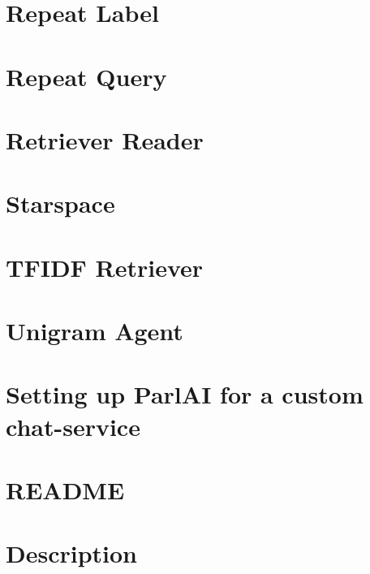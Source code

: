 \documentclass[twoside]{book}
\newcommand{\+}{\discretionary{\mbox{\scriptsize$\hookleftarrow$}}{}{}}
\begin{document}
\chapter{Repeat Label}
\label{md_parlai_agents_repeat_label_README}

\chapter{Repeat Query}
\label{md_parlai_agents_repeat_query_README}

\chapter{Retriever Reader}
\label{md_parlai_agents_retriever_reader_README}

\chapter{Starspace}
\label{md_parlai_agents_starspace_README}

\chapter{T\+F\+I\+DF Retriever}
\label{md_parlai_agents_tfidf_retriever_README}

\chapter{Unigram Agent}
\label{md_parlai_agents_unigram_README}

\chapter{Setting up Parl\+AI for a custom chat-\/service}
\label{md_parlai_chat_service_README}

\chapter{R\+E\+A\+D\+ME}
\label{md_parlai_core_README}

\chapter{Description}
\label{md_parlai_mturk_core_dev_react_server_README}

\end{document}
